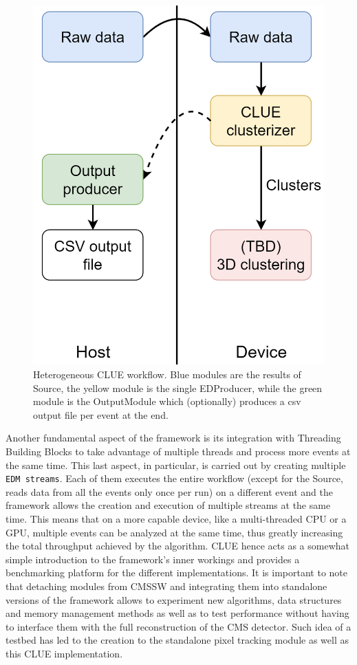 \begin{figure}[H]
    \centering
    \includegraphics[scale=0.7]{media/hclue_workflow.png}
    \caption{Heterogeneous CLUE workflow. Blue modules are the results of Source, the yellow module is the single EDProducer, while the green module is the OutputModule which (optionally) produces a csv output file per event at the end.}
    \label{fig:hclue_workflow}
\end{figure}

Another fundamental aspect of the framework is its integration with Threading Building Blocks to take advantage of multiple threads and process more events at the same time. This last aspect, in particular, is carried out by creating multiple \texttt{EDM streams}. Each of them executes the entire workflow (except for the Source, reads data from all the events only once per run) on a different event and the framework allows the creation and execution of multiple streams at the same time. This means that on a more capable device, like a multi-threaded CPU or a GPU, multiple events can be analyzed at the same time, thus greatly increasing the total throughput achieved by the algorithm.
CLUE hence acts as a somewhat simple introduction to the framework's inner workings and provides a benchmarking platform for the different implementations. It is important to note that detaching modules from CMSSW and integrating them into standalone versions of the framework allows to experiment new algorithms, data structures and memory management methods as well as to test performance without having to interface them with the full reconstruction of the CMS detector. Such idea of a testbed has led to the creation to the standalone pixel tracking module as well as this CLUE implementation.

